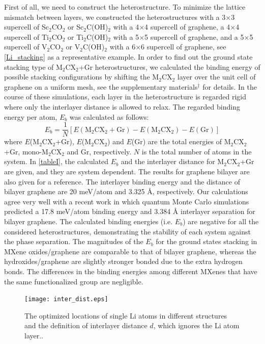 First of all, we need to construct the heterostructure. To minimize the lattice mismatch between layers, we constructed the heterostructures with a 3$\times$3 supercell of Sc$_2$CO$_2$ or Sc$_2$C(OH)$_2$ with a 4$\times$4 supercell of graphene, a  4$\times$4 supercell of Ti$_2$CO$_2$ or Ti$_2$C(OH)$_2$ with a 5$\times$5 supercell of graphene, and a 5$\times$5 supercell of V$_2$CO$_2$ or V$_2$C(OH)$_2$ with a 6$\times$6 supercell of graphene, see \autoref{Li_stacking} as a representative example. In order to find out the ground state stacking type of M$_2$CX$_2$+Gr heterostructures, we calculated the binding energy of possible stacking configurations by shifting the M$_2$CX$_2$ layer over the unit cell of graphene on a uniform mesh, see the supplementary materials$^\dag$ for details. In the course of these simulations, each layer in the heterostructure is regarded rigid where only the interlayer distance is allowed to relax. The regarded binding energy per atom, $E_b$ was calculated as follows:
\begin{equation}
E_b=\frac{1}{N}[E(\mathrm{M}_2\mathrm{C}\mathrm{X}_2+\mathrm{Gr})-E(\mathrm{M}_2\mathrm{C}\mathrm{X}_2)-E(\mathrm{Gr})]
\end{equation}
where $E$(M$_2$CX$_2$+Gr), $E$(M$_2$CX$_2$) and $E$(Gr) are the total energies of M$_2$CX$_2$+Gr, mono-M$_2$CX$_2$ and Gr, respectively. $N$ is the total number of atoms in the system. In \autoref{tableI}, the calculated $E_b$ and the interlayer distance for M$_2$CX$_2$+Gr are given, and they are system dependent. The results for graphene bilayer are also given for a reference. The interlayer binding energy and the distance of bilayer graphene are 20 meV/atom and 3.325 {\AA}, respectively. Our calculations agree very well with a recent work in which quantum Monte Carlo simulations predicted a 17.8 meV/atom binding energy and 3.384 {\AA} interlayer separation for bilayer graphene\cite{PhysRevLett.115.115501}.  The calculated binding energies (i.e. $E_b$) are negative for all the considered heterostructures, demonstrating the stability of each system against the phase separation. The magnitudes of the $E_b$ for the ground states stacking in MXene oxides/graphene are comparable to that of bilayer graphene, whereas the hydroxides/graphene are slightly stronger bonded due to the extra hydrogen bonds. The differences in the binding energies among different MXenes that have the same functionalized group are negligible. 



\begin{figure}[htb]
\centering
\texttt{[image: inter\_dist.eps]}%
\caption{The optimized locations of single Li atoms in different structures and the definition of interlayer distance $d$, which ignores the Li atom layer.\label{inter-dist}.}
\end{figure}

